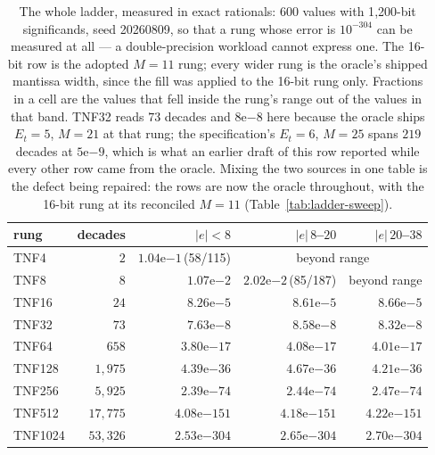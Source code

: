 \documentclass[11pt]{article}
\theoremstyle{definition}
\begin{document}
\begin{table}[t]\centering
\caption{The whole ladder, measured in exact rationals: 600 values with
1{,}200-bit significands, seed 20260809, so that a rung whose error is
$10^{-304}$ can be measured at all --- a double-precision workload cannot express
one. The 16-bit row is the adopted $M{=}11$ rung; every wider rung is the oracle's
shipped mantissa width, since the fill was applied to the 16-bit rung only.
Fractions in a cell are the values that fell inside the rung's range out of the
values in that band. TNF32 reads $73$ decades and $8\mathrm{e}{-8}$ here because
the oracle ships $E_t{=}5$, $M{=}21$ at that rung; the specification's
$E_t{=}6$, $M{=}25$ spans $219$ decades at $5\mathrm{e}{-9}$, which is what an
earlier draft of this row reported while every other row came from the oracle.
Mixing the two sources in one table is the defect being repaired: the rows are now
the oracle throughout, with the 16-bit rung at its reconciled $M{=}11$
(Table~\ref{tab:ladder-sweep}).}
\label{tab:ladderacc}
\begin{tabular}{lrrrr}
\toprule
rung & decades & $|e|<8$ & $|e|\,8$--$20$ & $|e|\,20$--$38$ \\
\midrule
TNF4    & $2$      & $1.04\mathrm{e}{-1}$\,(58/115) & \multicolumn{2}{c}{beyond range} \\
TNF8    & $8$      & $1.07\mathrm{e}{-2}$ & $2.02\mathrm{e}{-2}$\,(85/187) & beyond range \\
TNF16   & $24$     & $8.26\mathrm{e}{-5}$   & $8.61\mathrm{e}{-5}$   & $8.66\mathrm{e}{-5}$ \\
TNF32   & $73$     & $7.63\mathrm{e}{-8}$   & $8.58\mathrm{e}{-8}$   & $8.32\mathrm{e}{-8}$ \\
TNF64   & $658$    & $3.80\mathrm{e}{-17}$  & $4.08\mathrm{e}{-17}$  & $4.01\mathrm{e}{-17}$ \\
TNF128  & $1{,}975$  & $4.39\mathrm{e}{-36}$  & $4.67\mathrm{e}{-36}$  & $4.21\mathrm{e}{-36}$ \\
TNF256  & $5{,}925$  & $2.39\mathrm{e}{-74}$  & $2.44\mathrm{e}{-74}$  & $2.47\mathrm{e}{-74}$ \\
TNF512  & $17{,}775$ & $4.08\mathrm{e}{-151}$ & $4.18\mathrm{e}{-151}$ & $4.22\mathrm{e}{-151}$ \\
TNF1024 & $53{,}326$ & $2.53\mathrm{e}{-304}$ & $2.65\mathrm{e}{-304}$ & $2.70\mathrm{e}{-304}$ \\
\bottomrule
\end{tabular}
\end{table}
\end{document}
